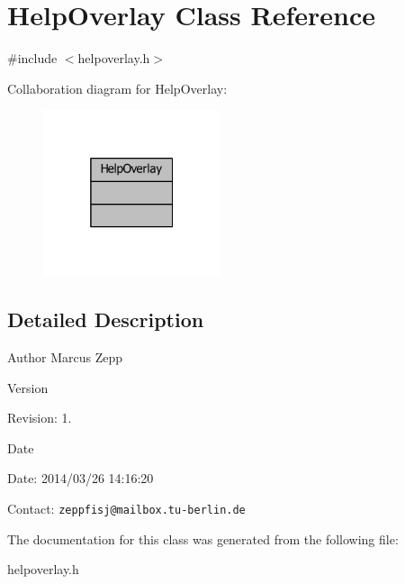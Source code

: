 \section{Help\-Overlay Class Reference}
\label{classHelpOverlay}


{\ttfamily \#include $<$helpoverlay.\-h$>$}



Collaboration diagram for Help\-Overlay\-:
\nopagebreak
\begin{figure}[H]
\begin{center}
\leavevmode
\includegraphics[width=148pt]{d8/dc5/classHelpOverlay__coll__graph}
\end{center}
\end{figure}


\subsection{Detailed Description}
\begin{DoxyAuthor}{Author}
Marcus Zepp
\end{DoxyAuthor}
\begin{DoxyVersion}{Version}

\end{DoxyVersion}
\begin{DoxyParagraph}{Revision\-:}
1. 
\end{DoxyParagraph}


\begin{DoxyDate}{Date}

\end{DoxyDate}
\begin{DoxyParagraph}{Date\-:}
2014/03/26 14\-:16\-:20 
\end{DoxyParagraph}


Contact\-: {\tt zeppfisj@mailbox.\-tu-\/berlin.\-de} 

The documentation for this class was generated from the following file\-:\begin{DoxyCompactItemize}
\item 
helpoverlay.\-h\end{DoxyCompactItemize}
